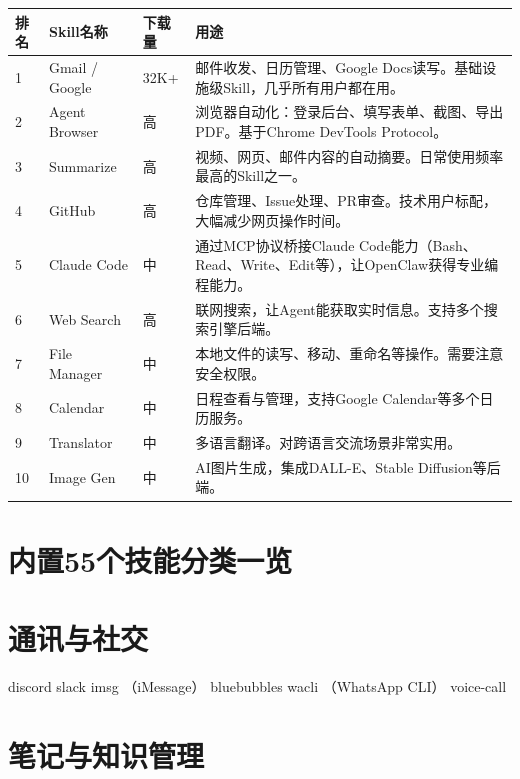 \documentclass[
  10
]{article}
\newcounter{none} %
\begin{document}
{\def\LTcaptype{none} %
\begin{longtable}[]{@{}|l|l|l|l|@{}}
\toprule\noalign{}
\endhead
\bottomrule\noalign{}
\endlastfoot
\hline
排名 & Skill名称 & 下载量 & 用途 \\
\hline
1 & Gmail / Google & 32K+ & 邮件收发、日历管理、Google
Docs读写。基础设施级Skill，几乎所有用户都在用。 \\
\hline
2 & Agent Browser & 高 &
浏览器自动化：登录后台、填写表单、截图、导出PDF。基于Chrome DevTools
Protocol。 \\
\hline
3 & Summarize & 高 &
视频、网页、邮件内容的自动摘要。日常使用频率最高的Skill之一。 \\
\hline
4 & GitHub & 高 &
仓库管理、Issue处理、PR审查。技术用户标配，大幅减少网页操作时间。 \\
\hline
5 & Claude Code & 中 & 通过MCP协议桥接Claude
Code能力（Bash、Read、Write、Edit等），让OpenClaw获得专业编程能力。 \\
\hline
6 & Web Search & 高 &
联网搜索，让Agent能获取实时信息。支持多个搜索引擎后端。 \\
\hline
7 & File Manager & 中 &
本地文件的读写、移动、重命名等操作。需要注意安全权限。 \\
\hline
8 & Calendar & 中 & 日程查看与管理，支持Google
Calendar等多个日历服务。 \\
\hline
9 & Translator & 中 & 多语言翻译。对跨语言交流场景非常实用。 \\
\hline
10 & Image Gen & 中 & AI图片生成，集成DALL-E、Stable
Diffusion等后端。 \\
\hline
\end{longtable}
}

\section{内置55个技能分类一览}\label{ux5185ux7f6e55ux4e2aux6280ux80fdux5206ux7c7bux4e00ux89c8}

\section{通讯与社交}\label{ux901aux8bafux4e0eux793eux4ea4}

discord slack imsg （iMessage） bluebubbles wacli （WhatsApp CLI）
voice-call

\section{笔记与知识管理}\label{ux7b14ux8bb0ux4e0eux77e5ux8bc6ux7ba1ux7406}
\end{document}
